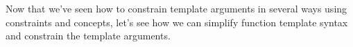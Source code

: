 Now that we’ve seen how to constrain template arguments in several ways using constraints and concepts, let’s see how we can simplify function template syntax and constrain the template arguments.




































































